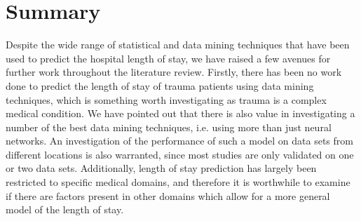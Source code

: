 \section{Summary}
Despite the wide range of statistical and data mining techniques that have been
used to predict the hospital length of stay, we have raised a few avenues for
further work throughout the literature review. Firstly, there has been no work
done to predict the length of stay of trauma patients using data mining
techniques, which is something worth investigating as trauma is a complex
medical condition. We have pointed out that there is also value in
investigating a number of the best data mining techniques, i.e. using more
than just neural networks. An investigation of the performance
of such a model on data sets from different locations is also warranted, since
most studies are
only validated on one or two data sets. Additionally, length of stay prediction
has largely been restricted to specific medical domains, and therefore it is
worthwhile to examine if there are factors present in other domains which allow
for a more general model of the length of stay. 

